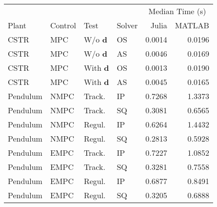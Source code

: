 \begin{tabular}{llllrr}
	
\toprule %

	  &	& & & \multicolumn{2}{c}{Median Time (s)} \\ \cmidrule(l){5-6}
Plant & Control & Test & Solver & Julia & MATLAB \\
\midrule %

CSTR		& MPC	& W/o $\mathbf{d}$	& OS & \num{0.0014} & \num{0.0196}	\\
CSTR		& MPC	& W/o $\mathbf{d}$	& AS & \num{0.0046} & \num{0.0169}	\\
CSTR		& MPC	& With $\mathbf{d}$ & OS & \num{0.0013} & \num{0.0190}	\\
CSTR		& MPC	& With $\mathbf{d}$ & AS & \num{0.0045} & \num{0.0165}	\\
Pendulum 	& NMPC	& Track. 	   		& IP & \num{0.7268} & \num{1.3373}	\\
Pendulum 	& NMPC	& Track. 	   		& SQ & \num{0.3081} & \num{0.6565}	\\
Pendulum    & NMPC	& Regul. 			& IP & \num{0.6264} & \num{1.4432} 	\\
Pendulum    & NMPC	& Regul. 			& SQ & \num{0.2813} & \num{0.5928} 	\\
Pendulum    & EMPC	& Track.			& IP & \num{0.7227} & \num{1.0852} 	\\
Pendulum    & EMPC	& Track.			& SQ & \num{0.3281} & \num{0.7558} 	\\
Pendulum	& EMPC	& Regul. 			& IP & \num{0.6877} & \num{0.8491} 	\\
Pendulum	& EMPC	& Regul. 			& SQ & \num{0.3205} & \num{0.6888}  \\
	
\bottomrule %
	
\end{tabular}